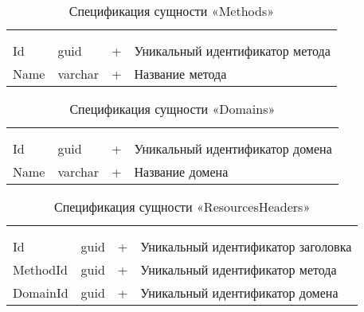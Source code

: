 \begin{xltabular}{\textwidth}{|X|X|X|X|}
	\caption{Спецификация сущности «Methods»}\label{crawler_methods:table}\\ \hline
	 &  &  &  \\ \hline
	 &  &  &  \\ \hline
	\endfirsthead
	 \hline
	 &  &  &  \\ \hline
	\endhead
	Id & guid & + & Уникальный идентификатор метода \\ \hline
	Name & varchar & + & Название метода \\ \hline
\end{xltabular}

\begin{xltabular}{\textwidth}{|X|X|X|X|}
	\caption{Спецификация сущности «Domains»}\label{crawler_domains:table}\\ \hline
	 &  &  &  \\ \hline
	 &  &  &  \\ \hline
	\endfirsthead
	 \hline
	 &  &  &  \\ \hline
	\endhead
	Id & guid & + & Уникальный идентификатор домена \\ \hline
	Name & varchar & + & Название домена \\ \hline
\end{xltabular}

\begin{xltabular}{\textwidth}{|X|X|X|X|}
	\caption{Спецификация сущности «ResourcesHeaders»}\label{crawler_resources_headers:table}\\ \hline
	 &  &  &  \\ \hline
	 &  &  &  \\ \hline
	\endfirsthead
	 \hline
	 &  &  &  \\ \hline
	\endhead
	Id & guid & + & Уникальный идентификатор заголовка \\ \hline
	MethodId & guid & + & Уникальный идентификатор метода \\ \hline
	DomainId & guid & + & Уникальный идентификатор домена \\ \hline
\end{xltabular}

